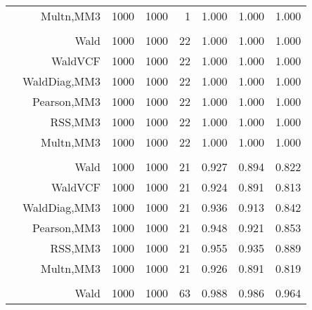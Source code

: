 \documentclass[
]{article}
\begin{document}
\begin{table}[H]
{\begin{tabular}[t]{lrrrrrrr}
\hspace{1em} & Multn,MM3 & 1000 & 1000 & 1 & 1.000 & 1.000 & 1.000\\
\cmidrule{1-8}
\addlinespace[0.3em]
\multicolumn{8}{l}{\textbf{1F 15V}}\\
\hspace{1em} & Wald & 1000 & 1000 & 22 & 1.000 & 1.000 & 1.000\\

\hspace{1em} & WaldVCF & 1000 & 1000 & 22 & 1.000 & 1.000 & 1.000\\

\hspace{1em} & WaldDiag,MM3 & 1000 & 1000 & 22 & 1.000 & 1.000 & 1.000\\

\hspace{1em} & Pearson,MM3 & 1000 & 1000 & 22 & 1.000 & 1.000 & 1.000\\

\hspace{1em} & RSS,MM3 & 1000 & 1000 & 22 & 1.000 & 1.000 & 1.000\\

\hspace{1em} & Multn,MM3 & 1000 & 1000 & 22 & 1.000 & 1.000 & 1.000\\
\cmidrule{1-8}
\addlinespace[0.3em]
\multicolumn{8}{l}{\textbf{2F 10V}}\\
\hspace{1em} & Wald & 1000 & 1000 & 21 & 0.927 & 0.894 & 0.822\\

\hspace{1em} & WaldVCF & 1000 & 1000 & 21 & 0.924 & 0.891 & 0.813\\

\hspace{1em} & WaldDiag,MM3 & 1000 & 1000 & 21 & 0.936 & 0.913 & 0.842\\

\hspace{1em} & Pearson,MM3 & 1000 & 1000 & 21 & 0.948 & 0.921 & 0.853\\

\hspace{1em} & RSS,MM3 & 1000 & 1000 & 21 & 0.955 & 0.935 & 0.889\\

\hspace{1em} & Multn,MM3 & 1000 & 1000 & 21 & 0.926 & 0.891 & 0.819\\
\cmidrule{1-8}
\addlinespace[0.3em]
\multicolumn{8}{l}{\textbf{3F 15V}}\\
\hspace{1em} & Wald & 1000 & 1000 & 63 & 0.988 & 0.986 & 0.964\\


\end{tabular}}
\end{table}
\end{document}
